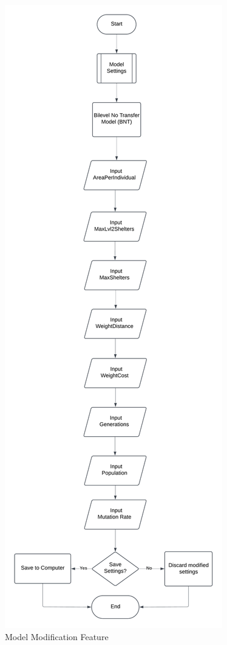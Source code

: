 \begin{appendices}
\begin{centerappendixtitle}
		\begin{figure}[h]
			\centering
			\caption{Model Modification Feature}
			\label{modelFLow}
			\includegraphics[width=\textwidth,height=\textheight,keepaspectratio]{appendix/modelset f}
		\end{figure}
		

\end{centerappendixtitle}
\end{appendices}
